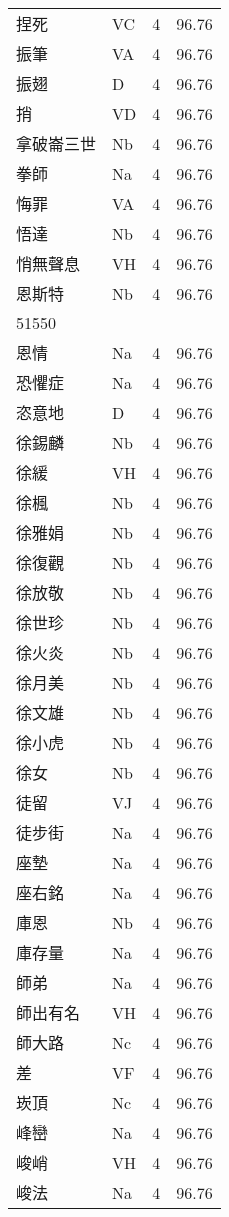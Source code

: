 \documentclass[twocolumn]{book}
\begin{document}
\begin{supertabular}{llrr}
捏死 & VC & 4 &  96.76\\
振筆 & VA & 4 &  96.76\\
振翅 & D & 4 &  96.76\\
捎 & VD & 4 &  96.76\\
拿破崙三世 & Nb & 4 &  96.76\\
拳師 & Na & 4 &  96.76\\
悔罪 & VA & 4 &  96.76\\
悟達 & Nb & 4 &  96.76\\
悄無聲息 & VH & 4 &  96.76\\
恩斯特 & Nb & 4 &  96.76\\
51550\\
恩情 & Na & 4 &  96.76\\
恐懼症 & Na & 4 &  96.76\\
恣意地 & D & 4 &  96.76\\
徐錫麟 & Nb & 4 &  96.76\\
徐緩 & VH & 4 &  96.76\\
徐楓 & Nb & 4 &  96.76\\
徐雅娟 & Nb & 4 &  96.76\\
徐復觀 & Nb & 4 &  96.76\\
徐放敬 & Nb & 4 &  96.76\\
徐世珍 & Nb & 4 &  96.76\\
徐火炎 & Nb & 4 &  96.76\\
徐月美 & Nb & 4 &  96.76\\
徐文雄 & Nb & 4 &  96.76\\
徐小虎 & Nb & 4 &  96.76\\
徐女 & Nb & 4 &  96.76\\
徒留 & VJ & 4 &  96.76\\
徒步街 & Na & 4 &  96.76\\
座墊 & Na & 4 &  96.76\\
座右銘 & Na & 4 &  96.76\\
庫恩 & Nb & 4 &  96.76\\
庫存量 & Na & 4 &  96.76\\
師弟 & Na & 4 &  96.76\\
師出有名 & VH & 4 &  96.76\\
師大路 & Nc & 4 &  96.76\\
差 & VF & 4 &  96.76\\
崁頂 & Nc & 4 &  96.76\\
峰巒 & Na & 4 &  96.76\\
峻峭 & VH & 4 &  96.76\\
峻法 & Na & 4 &  96.76\\

\end{supertabular}
\end{document}
